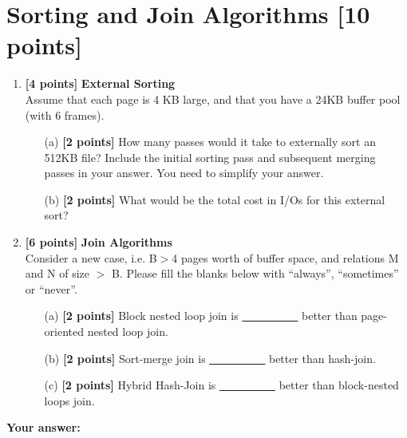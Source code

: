 \documentclass[10pt]{article}
\begin{document}
\newpage
\section{Sorting and Join Algorithms \textbf{[10 points]}}
\begin{enumerate}

	\item \textbf{[4 points]}  \textbf{External Sorting} \\
	      Assume that each page is 4 KB large, and that you have a 24KB buffer pool (with 6 frames).
	      \begin{itemize}
		      \item[(a)] \textbf{[2 points]} How many passes would it take to externally sort an 512KB file?
		            Include the initial sorting pass and subsequent merging passes in your answer. You need to simplify your answer. \\

		      \item[(b)] \textbf{[2 points]} What would be the total cost in I/Os for this external sort? \\

	      \end{itemize}


	\item \textbf{[6 points]} \textbf{Join Algorithms} \\
	      Consider a new case, i.e. B$>$4 pages worth of buffer space, and relations M and N of size $>$ B.
	      Please fill the blanks below with ``always'', ``sometimes'' or ``never''.
	      \begin{itemize}
		      \item[(a)] \textbf{[2 points]} Block nested loop join is \underline{\ \ \ \ \ \ \ \ \ \ } better than page-oriented nested loop join. \\

		      \item[(b)] \textbf{[2 points]} Sort-merge join is \underline{\ \ \ \ \ \ \ \ \ \ } better than hash-join. \\

		      \item[(c)] \textbf{[2 points]} Hybrid Hash-Join is \underline{\ \ \ \ \ \ \ \ \ \ } better than block-nested loops join. \\

	      \end{itemize}
\end{enumerate}
\textbf{Your answer:}
\end{document}
